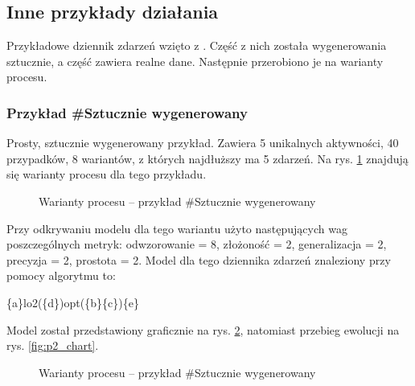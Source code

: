 \subsection{Inne przykłady działania}

Przykładowe dziennik zdarzeń wzięto z \cite{pm-book}. Część z nich została wygenerowania sztucznie, a część zawiera realne dane. Następnie przerobiono je na warianty procesu. 

\subsubsection{Przykład \#Sztucznie wygenerowany}
Prosty, sztucznie wygenerowany przykład. Zawiera 5 unikalnych aktywności, 40 przypadków, 8 wariantów, z których najdłuższy ma 5 zdarzeń. Na rys. \ref{fig:p2_variants} znajdują się warianty procesu dla tego przykładu.

\begin{figure}[H]
	\caption{\label{fig:p2_variants}Warianty procesu -- przykład \#Sztucznie wygenerowany}
\end{figure}

Przy odkrywaniu modelu dla tego wariantu użyto następujących wag poszczególnych metryk: odwzorowanie = 8, złożoność = 2, generalizacja = 2, precyzja = 2, prostota = 2. Model dla tego dziennika zdarzeń znaleziony przy pomocy algorytmu to:
\begin{center}
	\{a\}lo2(\{d\})opt(\{b\}\{c\})\{e\}
\end{center}
Model został przedstawiony graficznie na rys. \ref{fig:p2_model}, natomiast przebieg ewolucji na rys. \ref{fig:p2_chart}.

\begin{figure}[H]
	\caption{\label{fig:p2_model}Warianty procesu -- przykład \#Sztucznie wygenerowany}
\end{figure}

